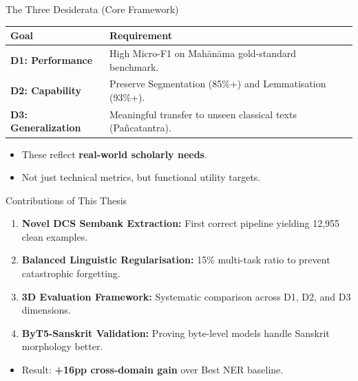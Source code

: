\documentclass[10pt]{beamer}
\def\tpage{}
\newcommand{\tp}[1]{\def\tpage{#1}}
\begin{document}
\begin{frame}{The Three Desiderata (Core Framework)}
    \tp{3}
    \begin{tabular}{lp{8cm}}
        \toprule
        \textbf{Goal} & \textbf{Requirement} \\
        \midrule
        \textbf{D1: Performance} & High Micro-F1 on Mahānāma gold-standard benchmark. \\
        \textbf{D2: Capability} & Preserve Segmentation (85\%+) and Lemmatisation (93\%+). \\
        \textbf{D3: Generalization} & Meaningful transfer to unseen classical texts (Pañcatantra). \\
        \bottomrule
    \end{tabular}
    \vfill
    \begin{itemize}
        \item These reflect \textbf{real-world scholarly needs}.
        \item Not just technical metrics, but functional utility targets.
    \end{itemize}
\end{frame}

\begin{frame}{Contributions of This Thesis}
    \tp{4}
    \begin{enumerate}
        \item \textbf{Novel DCS Sembank Extraction:} First correct pipeline yielding 12,955 clean examples.
        \item \textbf{Balanced Linguistic Regularisation:} 15\% multi-task ratio to prevent catastrophic forgetting.
        \item \textbf{3D Evaluation Framework:} Systematic comparison across D1, D2, and D3 dimensions.
        \item \textbf{ByT5-Sanskrit Validation:} Proving byte-level models handle Sanskrit morphology better.
    \end{enumerate}
    \vfill
    \begin{itemize}
        \item Result: \textbf{+16pp cross-domain gain} over Best NER baseline.
    \end{itemize}
\end{frame}
\end{document}
